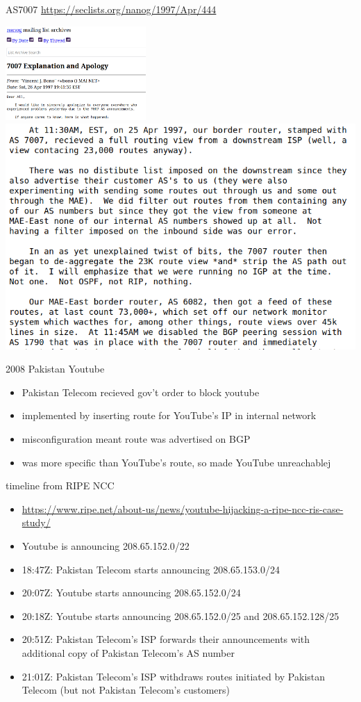
\begin{frame}{AS7007}
{\fontsize{8}{9}\selectfont\url{https://seclists.org/nanog/1997/Apr/444}}

\includegraphics[width=0.4\textwidth]{../routing/as7007-1.png}
\includegraphics[height=0.4\textwidth]{../routing/as7007-2.png}
\end{frame}

\begin{frame}{2008 Pakistan Youtube}
\begin{itemize}
\item Pakistan Telecom recieved gov't order to block youtube
\item implemented by inserting route for YouTube's IP in internal network
\vspace{.5cm}
\item misconfiguration meant route was advertised on BGP
\item was more specific than YouTube's route, so made YouTube unreachablej
\end{itemize}
\end{frame}

\begin{frame}{timeline from RIPE NCC}
\begin{itemize}
\item {\tiny \url{https://www.ripe.net/about-us/news/youtube-hijacking-a-ripe-ncc-ris-case-study/}}
\item Youtube is announcing 208.65.152.0/22
\item 18:47Z: Pakistan Telecom starts announcing 208.65.153.0/24
\item 20:07Z: Youtube starts announcing 208.65.152.0/24
\item 20:18Z: Youtube starts announcing 208.65.152.0/25 and 208.65.152.128/25
\item 20:51Z: Pakistan Telecom's ISP forwards their announcements with additional copy of Pakistan Telecom's AS number
\item 21:01Z: Pakistan Telecom's ISP withdraws routes initiated by Pakistan Telecom (but not Pakistan Telecom's customers)
\end{itemize}
\end{frame}

